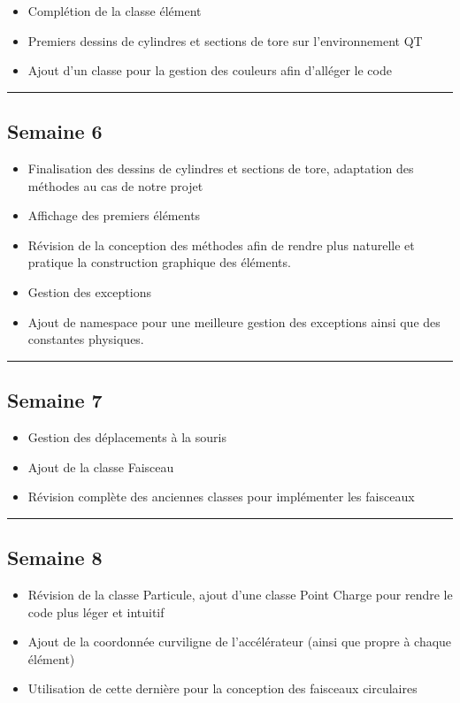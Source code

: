 \documentclass[12pt, letterpaper, twoside]{article}
\begin{document}
\begin{itemize}
\item Complétion de la classe élément
\item Premiers dessins de cylindres et sections de tore sur l'environnement QT
\item Ajout d'un classe pour la gestion des couleurs afin d'alléger le code
\end{itemize}

\rule{\textwidth}{0.4pt}

\subsection{Semaine 6 }
\begin{itemize}
\item Finalisation des dessins de cylindres et sections de tore, adaptation des méthodes au cas de notre projet
\item Affichage des premiers éléments
\item Révision de la conception des méthodes afin de rendre plus naturelle et pratique la construction graphique des éléments.
\item Gestion des exceptions
\item Ajout de namespace pour une meilleure gestion des exceptions ainsi que des constantes physiques.
\end{itemize}

\rule{\textwidth}{0.4pt}

\subsection{Semaine 7 }
\begin{itemize}
\item Gestion des déplacements à la souris
\item Ajout de la classe Faisceau
\item Révision complète des anciennes classes pour implémenter les faisceaux 
\end{itemize}

\rule{\textwidth}{0.4pt}

\subsection{Semaine 8 }
\begin{itemize}
\item Révision de la classe Particule, ajout d'une classe Point Charge pour rendre le code plus léger et intuitif
\item Ajout de la coordonnée curviligne de l'accélérateur (ainsi que propre à chaque élément)
\item Utilisation de cette dernière pour la conception des faisceaux circulaires
\end{itemize}
\end{document}
